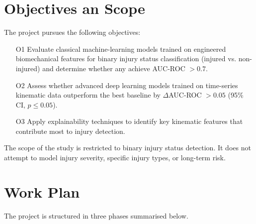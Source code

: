 \section{Objectives an Scope}\label{sec:intro-objectives-scope}




The project pursues the following objectives:
\begin{itemize}
    \item[O1] Evaluate classical machine-learning models trained on engineered biomechanical features for binary injury status classification (injured vs. non-injured) and determine whether any achieve AUC-ROC $> 0.7$.
    \item[O2] Assess whether advanced deep learning models trained on time-series kinematic data outperform the best baseline by $\Delta$AUC-ROC $> 0.05$ (95\% CI, $p \le 0.05$).
    \item[O3] Apply explainability techniques to identify key kinematic features that contribute most to injury detection.
\end{itemize}
The scope of the study is restricted to binary injury status detection. It does not attempt to model injury severity, specific injury types, or long-term risk.

\section{Work Plan}\label{sec:intro-work-plan}
The project is structured in three phases summarised below.
